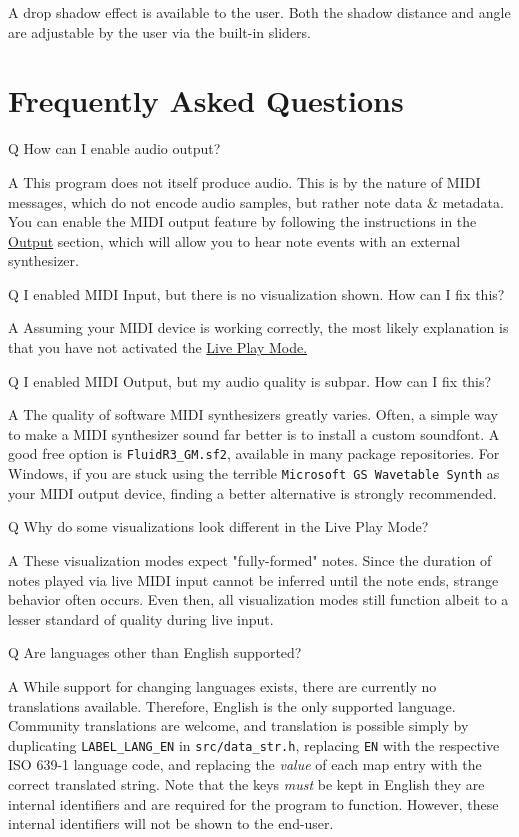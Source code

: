 \documentclass[english]{article}
\newcommand\faqQ[1]{%
  \leavevmode\par
  \noindent
{\hspace{4pt}\Large Q} \raisebox{0.1em}{\textendash{}} {\large #1}\par \vspace{-0.5em}}
\newcommand\faqA[2][]{%
  \leavevmode\par\noindent
  {\leftskip30pt
  {\large A} \raisebox{0.05em}{\textendash{}} \textbf{#1}#2\par \vspace{-0.25em}}}
\providecommand{\mi}[1]{\texttt{#1}}
\begin{document}
A drop shadow effect is available to the user. Both the shadow
distance and angle are adjustable by the user via the built-in sliders.

\section{Frequently Asked Questions}

\faqQ{How can I enable audio output?}

\faqA{This program does not itself produce audio. This is by the nature of MIDI messages, which do not encode audio samples,
but rather note data \& metadata. You can enable the MIDI output feature by following the instructions in the 
\textcolor{lcol}{\hyperref[subsec:output]{Output}} section, which will allow you to hear note events with an external
synthesizer.}

\faqQ{I enabled MIDI Input, but there is no visualization shown. How can I fix this?}

\faqA{Assuming your MIDI device is working correctly, the most likely explanation is that you have not activated the
\textcolor{lcol}{\hyperref[subsec:liveplay]{Live Play Mode.}}}

\faqQ{I enabled MIDI Output, but my audio quality is subpar. How can I fix this?}

\faqA{The quality of software MIDI synthesizers greatly varies. Often, a simple way to make a MIDI synthesizer sound
far better is to install a custom soundfont. A good free option is \mi{FluidR3_GM.sf2}, available in many
package repositories. For Windows, if you are stuck using the terrible \mi{Microsoft GS Wavetable Synth} as your
MIDI output device, finding a better alternative is strongly recommended.}

\faqQ{Why do some visualizations look different in the Live Play Mode?}

\faqA{These visualization modes expect "fully-formed" notes.
Since the duration of notes played via live MIDI input cannot be inferred until the note ends, 
strange behavior often occurs. Even then,
all visualization modes still function \textendash{} albeit to a lesser standard of quality \textendash{} during live input. 
}

\faqQ{Are languages other than English supported?}

\faqA{While support for changing languages exists, there are currently no translations available. Therefore,
English is the only supported language. Community translations are welcome, and translation is possible simply by
duplicating \mi{LABEL_LANG_EN} in \mi{src/data_str.h}, replacing \mi{EN} with the respective ISO 639-1 language code,
and replacing the \textit{value} of each map entry with the correct translated string. Note that the keys \textit{must} be
kept in English \textendash{} they are internal identifiers and are required for the program to function. However, these internal
identifiers will not be shown to the end-user.}
\end{document}
